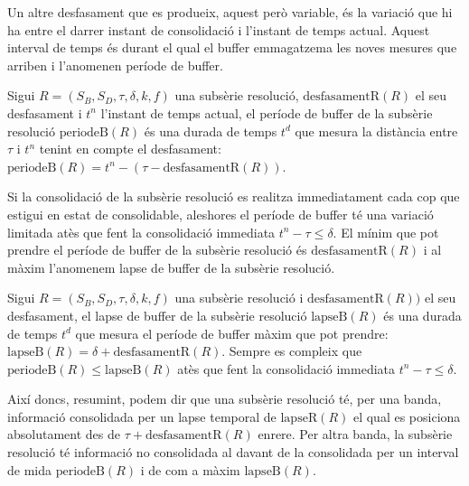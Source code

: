 Un altre desfasament que es produeix, aquest però variable, és la
variació que hi ha entre el darrer instant de consolidació i l'instant
de temps actual. Aquest interval de temps és durant el qual el buffer
emmagatzema les noves mesures que arriben i l'anomenen període de
buffer.
\begin{definition}
  Sigui $R=(S_B,S_D,\tau,\delta,k,f)$ una subsèrie resolució,
  $\text{desfasamentR}(R)$ el seu desfasament i $t^n$ l'instant de
  temps actual, el període de buffer de la subsèrie resolució
  $\text{periodeB}(R)$ és una durada de temps $t^d$ que mesura la
  distància entre $\tau$ i $t^n$ tenint en compte el desfasament:
  $\text{periodeB}(R) = t^n - (\tau - \text{desfasamentR}(R))$.
\end{definition}

Si la consolidació de la subsèrie resolució es realitza immediatament
cada cop que estigui en estat de consolidable, aleshores el període de
buffer té una variació limitada atès que fent la consolidació
immediata $t^n - \tau \leq \delta$. El mínim que pot prendre el
període de buffer de la subsèrie resolució és $\text{desfasamentR}(R)$
i al màxim l'anomenem lapse de buffer de la subsèrie resolució.
\begin{definition}
  Sigui $R=(S_B,S_D,\tau,\delta,k,f)$ una subsèrie resolució i
  $\text{desfasamentR}(R))$ el seu desfasament, el lapse de buffer de
  la subsèrie resolució $\text{lapseB}(R)$ és una durada de temps
  $t^d$ que mesura el període de buffer màxim que pot prendre:
  $\text{lapseB}(R) = \delta + \text{desfasamentR}(R)$.  Sempre es
  compleix que $\text{periodeB}(R) \leq \text{lapseB}(R)$ atès que
  fent la consolidació immediata $t^n - \tau \leq \delta$.
\end{definition}


Així doncs, resumint, podem dir que una subsèrie resolució té, per una
banda, informació consolidada per un lapse temporal de
$\text{lapseR}(R)$ el qual es posiciona absolutament des de $\tau +
\text{desfasamentR}(R)$ enrere. Per altra banda, la subsèrie resolució
té informació no consolidada al davant de la consolidada per un
interval de mida $\text{periodeB}(R)$ i de com a màxim
$\text{lapseB}(R)$.




